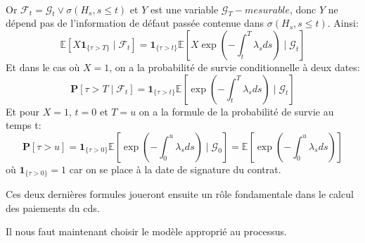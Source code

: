 \begin{align*}
\end{align*}
Or $\mathcal{F}_t = \mathcal{G}_t \lor \sigma(H_s, s \le t)$ et $Y$ est une variable $\mathcal{G}_T-mesurable$, donc $Y$ ne dépend pas de l'information de défaut passée contenue dans $\sigma(H_s, s \le t)$. Ainsi:
\begin{equation}
    \mathbb{E}[X \mathbf{1}_{\{\tau > T\}} \mid \mathcal{F}_t] = \mathbf{1}_{\{\tau > t\}}\mathbb{E}[X\exp(-\int_t^T \lambda_s ds) \mid \mathcal{G}_t]
    \label{eq:formule_reduction}
\end{equation}
Et dans le cas où $X = 1$, on a la probabilité de survie conditionnelle à deux dates:
\begin{equation*}
    \mathbf{P}[\tau > T \mid \mathcal{F}_t] = \mathbf{1}_{\{\tau > t\}}\mathbb{E}[\exp(-\int_t^T \lambda_s ds) \mid \mathcal{G}_t]
\end{equation*}
Et pour $X = 1$, $t = 0$ et $T = u$ on a la formule de la probabilité de survie au temps t:
\begin{equation*}
    \mathbf{P}[\tau > u] = \mathbf{1}_{\{\tau > 0\}}\mathbb{E}[\exp(-\int_0^u \lambda_s ds) \mid \mathcal{G}_0] = \mathbb{E}[\exp(-\int_0^u \lambda_s ds)]
\end{equation*}
où $\mathbf{1}_{\{\tau > 0\}} = 1$ car on se place à la date de signature du contrat.

Ces deux dernières formules joueront ensuite un rôle fondamentale dans le calcul des paiements du \gls{cds}.

Il nous faut maintenant choisir le modèle approprié au processus.



